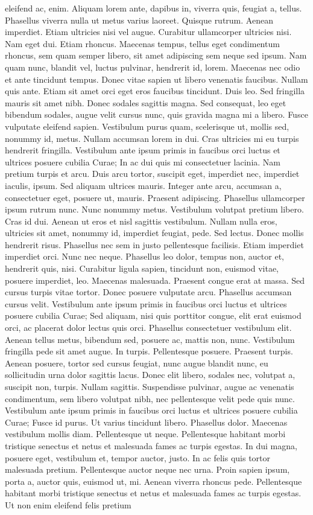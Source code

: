 eleifend ac, enim. Aliquam lorem ante, dapibus in, viverra quis, feugiat a, tellus. Phasellus viverra nulla ut metus varius laoreet. Quisque rutrum. Aenean imperdiet. Etiam ultricies nisi vel augue. Curabitur ullamcorper ultricies nisi. Nam eget dui. Etiam rhoncus. Maecenas tempus, tellus eget condimentum rhoncus, sem quam semper libero, sit amet adipiscing sem neque sed ipsum. Nam quam nunc, blandit vel, luctus pulvinar, hendrerit id, lorem. Maecenas nec odio et ante tincidunt tempus. Donec vitae sapien ut libero venenatis faucibus. Nullam quis ante. Etiam sit amet orci eget eros faucibus tincidunt. Duis leo. Sed fringilla mauris sit amet nibh. Donec sodales sagittis magna. Sed consequat, leo eget bibendum sodales, augue velit cursus nunc, quis gravida magna mi a libero. Fusce vulputate eleifend sapien. Vestibulum purus quam, scelerisque ut, mollis sed, nonummy id, metus. Nullam accumsan lorem in dui. Cras ultricies mi eu turpis hendrerit fringilla. Vestibulum ante ipsum primis in faucibus orci luctus et ultrices posuere cubilia Curae; In ac dui quis mi consectetuer lacinia. Nam pretium turpis et arcu. Duis arcu tortor, suscipit eget, imperdiet nec, imperdiet iaculis, ipsum. Sed aliquam ultrices mauris. Integer ante arcu, accumsan a, consectetuer eget, posuere ut, mauris. Praesent adipiscing. Phasellus ullamcorper ipsum rutrum nunc. Nunc nonummy metus. Vestibulum volutpat pretium libero. Cras id dui. Aenean ut eros et nisl sagittis vestibulum. Nullam nulla eros, ultricies sit amet, nonummy id, imperdiet feugiat, pede. Sed lectus. Donec mollis hendrerit risus. Phasellus nec sem in justo pellentesque facilisis. Etiam imperdiet imperdiet orci. Nunc nec neque. Phasellus leo dolor, tempus non, auctor et, hendrerit quis, nisi. Curabitur ligula sapien, tincidunt non, euismod vitae, posuere imperdiet, leo. Maecenas malesuada. Praesent congue erat at massa. Sed cursus turpis vitae tortor. Donec posuere vulputate arcu. Phasellus accumsan cursus velit. Vestibulum ante ipsum primis in faucibus orci luctus et ultrices posuere cubilia Curae; Sed aliquam, nisi quis porttitor congue, elit erat euismod orci, ac placerat dolor lectus quis orci. Phasellus consectetuer vestibulum elit. Aenean tellus metus, bibendum sed, posuere ac, mattis non, nunc. Vestibulum fringilla pede sit amet augue. In turpis. Pellentesque posuere. Praesent turpis. Aenean posuere, tortor sed cursus feugiat, nunc augue blandit nunc, eu sollicitudin urna dolor sagittis lacus. Donec elit libero, sodales nec, volutpat a, suscipit non, turpis. Nullam sagittis. Suspendisse pulvinar, augue ac venenatis condimentum, sem libero volutpat nibh, nec pellentesque velit pede quis nunc. Vestibulum ante ipsum primis in faucibus orci luctus et ultrices posuere cubilia Curae; Fusce id purus. Ut varius tincidunt libero. Phasellus dolor. Maecenas vestibulum mollis diam. Pellentesque ut neque. Pellentesque habitant morbi tristique senectus et netus et malesuada fames ac turpis egestas. In dui magna, posuere eget, vestibulum et, tempor auctor, justo. In ac felis quis tortor malesuada pretium. Pellentesque auctor neque nec urna. Proin sapien ipsum, porta a, auctor quis, euismod ut, mi. Aenean viverra rhoncus pede. Pellentesque habitant morbi tristique senectus et netus et malesuada fames ac turpis egestas. Ut non enim eleifend felis pretium 